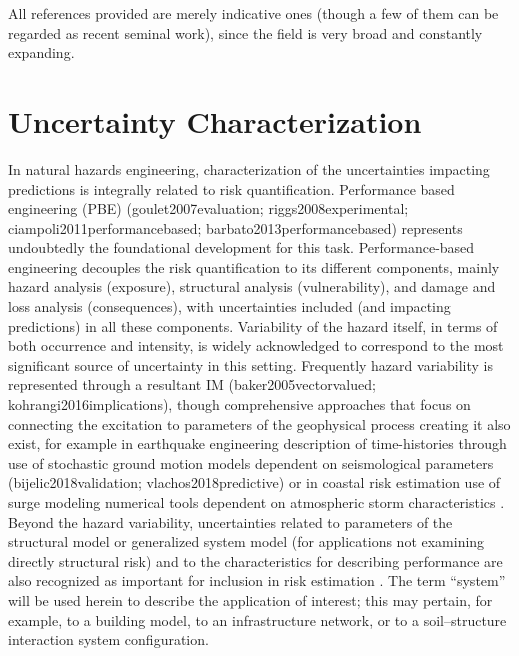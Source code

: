 All references provided are merely indicative ones (though a few of them can be regarded as recent seminal work), since the field is very broad and constantly expanding.

\section{Uncertainty Characterization}
\label{sec:uq_characterization}

In natural hazards engineering, characterization of the uncertainties impacting predictions is integrally related to risk quantification. Performance based engineering (PBE) (goulet2007evaluation; riggs2008experimental; ciampoli2011performancebased; barbato2013performancebased) represents undoubtedly the foundational development for this task. Performance-based engineering decouples the risk quantification to its different components, mainly hazard analysis (exposure), structural analysis (vulnerability), and damage and loss analysis (consequences), with uncertainties included (and impacting predictions) in all these components. Variability of the hazard itself, in terms of both occurrence and intensity, is widely acknowledged to correspond to the most significant source of uncertainty in this setting. Frequently hazard variability is represented through a resultant IM (baker2005vectorvalued; kohrangi2016implications), though comprehensive approaches that focus on connecting the excitation to parameters of the geophysical process creating it also exist, for example in earthquake engineering description of time-histories through use of stochastic ground motion models dependent on seismological parameters (bijelic2018validation; vlachos2018predictive) or in coastal risk estimation use of surge modeling numerical tools dependent on atmospheric storm characteristics \citep{resio2007white}. Beyond the hazard variability, uncertainties related to parameters of the structural model or generalized system model (for applications not examining directly structural risk) and to the characteristics for describing performance are also recognized as important for inclusion in risk estimation \citep{porter2002sensitivity}. The term “system” will be used herein to describe the application of interest; this may pertain, for example, to a building model, to an infrastructure network, or to a soil–structure interaction system configuration. 

